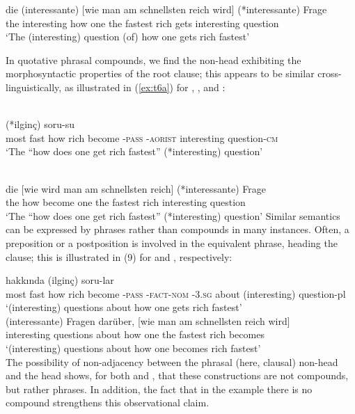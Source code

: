 \documentclass[output=paper]{LSP/langsci}
\begin{document}
\ea\label{ex:t5}
	\gll die (interessante) [wie man am schnellsten reich wird] (*interessante) Frage\\
	the interesting	  how one  the fastest	   rich  gets	interesting    question\\
\glt	`The (interesting) question (of) how one gets rich fastest'
\z

        In quotative phrasal compounds, we find the non-head
        exhibiting the morphosyntactic properties of the root clause;
        this appears to be similar cross-lingui\-sti\-cally, as
        illustrated in (\ref{ex:t6a}) for , , and :
       
\ea\label{ex:t6}
\ea\label{ex:t6a}
\\
	(*ilgin\c{c}) 	soru-su 	   \\
         most  fast       how    rich       become \textsc{-pass} \textsc{-aorist}	interesting	question-\textsc{cm}\\
\glt	`The ``how does one get rich fastest'' (*interesting) question'
    

\ex\label{ex:t6b}
\\
\gll die [wie wird man am schnellsten reich] (*interessante) Frage \\
        the  how become one the fastest   rich	interesting   question\\
\glt	`The ``how does one get rich fastest'' (*interesting) question'
\z
\z
        Similar semantics can be expressed by phrases rather than
        compounds in many instances. Often, a preposition or a
        postposition is involved in the equivalent phrase, heading the
        clause; this is illustrated in (9) for  and ,
        respectively:

\ea\label{ex:t7}
\ea\label{ex:t7a}
     hakk{\i}nda (ilgin\c{c})	soru-lar\\
	most  fast       how    rich       become \textsc{-pass} \textsc{-fact-nom} \textsc{-3.sg} about      (interesting)   question-pl\\
\glt	`(interesting) questions about how one gets rich fastest'\\

\ex\label{ex:t7b}
\gll	(interessante) Fragen darüber, [wie man am schnellsten reich wird]\\
	interesting    questions about   how one  the fastest        rich   becomes\\
\glt	`(interesting) questions about how one becomes rich fastest'\\
\z
\z
        The possibility of non-adjacency between the phrasal (here,
        clausal) non-head and the head shows, for both  and
        , that these constructions are not compounds, but rather
        phrases. In addition, the fact that in the  example
        there is no compound  strengthens this observational
        claim.
\end{document}
